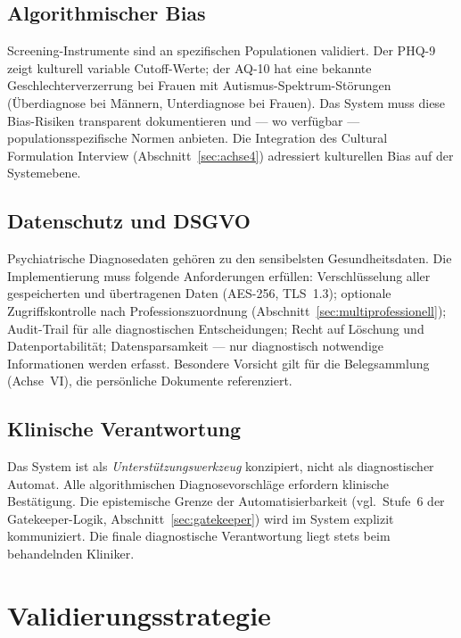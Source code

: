 \documentclass[11pt,a4paper]{article}
\begin{document}
\subsection{Algorithmischer Bias}

Screening-Instrumente sind an spezifischen Populationen validiert. Der PHQ-9 zeigt kulturell variable Cutoff-Werte; der AQ-10 hat eine bekannte Geschlechterverzerrung bei Frauen mit Autismus-Spektrum-St\"orungen (\"Uberdiagnose bei M\"annern, Unterdiagnose bei Frauen). Das System muss diese Bias-Risiken transparent dokumentieren und --- wo verf\"ugbar --- populationsspezifische Normen anbieten. Die Integration des Cultural Formulation Interview (Abschnitt~\ref{sec:achse4}) adressiert kulturellen Bias auf der Systemebene.

\subsection{Datenschutz und DSGVO}

Psychiatrische Diagnosedaten geh\"oren zu den sensibelsten Gesundheitsdaten. Die Implementierung muss folgende Anforderungen erf\"ullen: Verschl\"usselung aller gespeicherten und \"ubertragenen Daten (AES-256, TLS~1.3); optionale Zugriffskontrolle nach Professionszuordnung (Abschnitt~\ref{sec:multiprofessionell}); Audit-Trail f\"ur alle diagnostischen Entscheidungen; Recht auf L\"oschung und Datenportabilit\"at; Datensparsamkeit --- nur diagnostisch notwendige Informationen werden erfasst. Besondere Vorsicht gilt f\"ur die Belegsammlung (Achse~VI), die pers\"onliche Dokumente referenziert.

\subsection{Klinische Verantwortung}

Das System ist als \textit{Unterst\"utzungswerkzeug} konzipiert, nicht als diagnostischer Automat. Alle algorithmischen Diagnosevorschl\"age erfordern klinische Best\"atigung. Die epistemische Grenze der Automatisierbarkeit (vgl.\ Stufe~6 der Gatekeeper-Logik, Abschnitt~\ref{sec:gatekeeper}) wird im System explizit kommuniziert. Die finale diagnostische Verantwortung liegt stets beim behandelnden Kliniker.


\section{Validierungsstrategie}
\label{sec:validierung}
\end{document}
